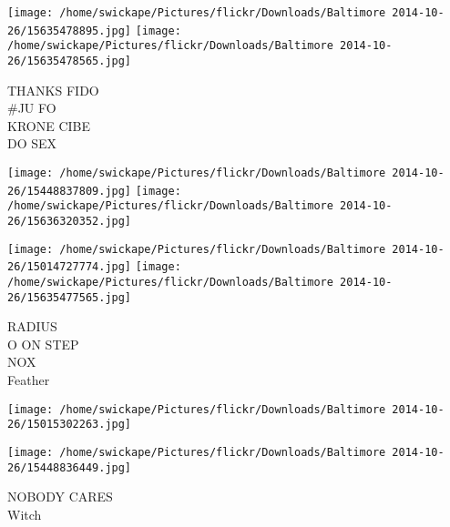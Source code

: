 \documentclass[10pt,letterpaper]{article}
\begin{document}
\texttt{[image: /home/swickape/Pictures/flickr/Downloads/Baltimore 2014-10-26/15635478895.jpg]}
\texttt{[image: /home/swickape/Pictures/flickr/Downloads/Baltimore 2014-10-26/15635478565.jpg]}

THANKS FIDO\\
\#JU FO\\
KRONE CIBE\\
DO SEX\\
\pagebreak

\texttt{[image: /home/swickape/Pictures/flickr/Downloads/Baltimore 2014-10-26/15448837809.jpg]}
\texttt{[image: /home/swickape/Pictures/flickr/Downloads/Baltimore 2014-10-26/15636320352.jpg]}

\texttt{[image: /home/swickape/Pictures/flickr/Downloads/Baltimore 2014-10-26/15014727774.jpg]}
\texttt{[image: /home/swickape/Pictures/flickr/Downloads/Baltimore 2014-10-26/15635477565.jpg]}

RADIUS\\
O ON STEP\\
NOX\\
Feather\\
\pagebreak

\texttt{[image: /home/swickape/Pictures/flickr/Downloads/Baltimore 2014-10-26/15015302263.jpg]}

\vspace{0.25in}
\texttt{[image: /home/swickape/Pictures/flickr/Downloads/Baltimore 2014-10-26/15448836449.jpg]}

NOBODY CARES\\
Witch\\
\pagebreak
\end{document}
